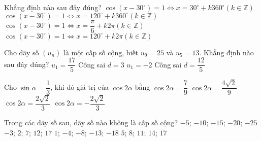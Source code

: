 \begin{ex}%
	Khẳng định nào sau đây đúng?
	\choice
	{\True $\cos(x-30^\circ)=1 \Leftrightarrow x=30^\circ+k360^\circ (k \in \mathbb{Z})$}
	{$\cos(x-30^\circ)=1 \Leftrightarrow x=120^\circ+k360^\circ (k \in \mathbb{Z})$}
	{$\cos(x-30^\circ)=1 \Leftrightarrow x=\dfrac{\pi}{6}+k2\pi (k \in \mathbb{Z})$}
	{$\cos(x-30^\circ)=1 \Leftrightarrow x=120^\circ+k2\pi (k \in \mathbb{Z})$}
\end{ex}

\begin{ex}%
	Cho dãy số $(u_n)$ là một cấp số cộng, biết $u_9=25$ và $u_5=13$. Khẳng định nào sau đây đúng?
	\choice
	{$u_1=\dfrac{17}{5}$}
	{\True Công sai $d=3$}
	{$u_1=-2$}
	{Công sai $d=\dfrac{12}{5}$}
\end{ex}

\begin{ex}%
	Cho $\sin{\alpha}=\dfrac{1}{3}$, khi đó giá trị của $\cos{2\alpha}$ bằng
	\choice
	{\True $\cos{2\alpha}=\dfrac{7}{9}$}
	{$\cos{2\alpha}=\dfrac{4\sqrt{2}}{9}$}
	{$\cos{2\alpha}=\dfrac{2\sqrt{2}}{3}$}
	{$\cos{2\alpha}=-\dfrac{2\sqrt{2}}{3}$}
\end{ex}

\begin{ex}%
	Trong các dãy số sau, dãy số nào không là cấp số cộng?
	\choice
	{$-5$; $-10$; $-15$; $-20$; $-25$}
	{$-3$; $2$; $7$; $12$; $17$}
	{\True $1$; $-4$; $-8$; $-13$; $-18$}
	{$5$; $8$; $11$; $14$; $17$}
\end{ex}

